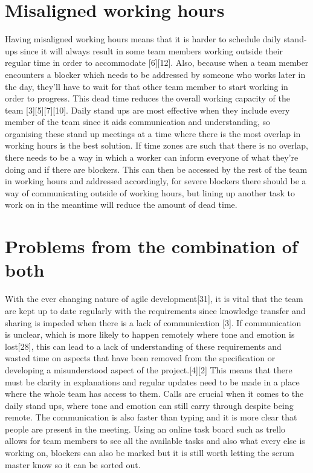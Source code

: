 \documentclass{scrartcl}
\begin{document}
\section{Misaligned working hours}

Having misaligned working hours means that it is harder to schedule daily stand-ups since it will always result in some team members working outside their regular time in order to accommodate [6][12]. Also, because when a team member encounters a blocker which needs to be addressed by someone who works later in the day, they’ll have to wait for that other team member to start working in order to progress. This dead time reduces the overall working capacity of the team [3][5][7][10].
Daily stand ups are most effective when they include every member of the team since it aids communication and understanding, so organising these stand up meetings at a time where there is the most overlap in working hours is the best solution. If time zones are such that there is no overlap, there needs to be a way in which a worker can inform everyone of what they’re doing and if there are blockers. This can then be accessed by the rest of the team in working hours and addressed accordingly, for severe blockers there should be a way of communicating outside of working hours, but lining up another task to work on in the meantime will reduce the amount of dead time.

\section{Problems from the combination of both}

With the ever changing nature of agile development[31], it is vital that the team are kept up to date regularly with the requirements since knowledge transfer and sharing is impeded when there is a lack of communication [3]. If communication is unclear, which is more likely to happen remotely where tone and emotion is lost[28], this can lead to a lack of understanding of these requirements and wasted time on aspects that have been removed from the specification or developing a misunderstood aspect of the project.[4][2] This means that there must be clarity in explanations and regular updates need to be made in a place where the whole team has access to them. Calls are crucial when it comes to the daily stand ups, where tone and emotion can still carry through despite being remote. The communication is also faster than typing and it is more clear that people are present in the meeting. Using an online task board such as trello allows for team members to see all the available tasks and also what every else is working on, blockers can also be marked but it is still worth letting the scrum master know so it can be sorted out.
\end{document}
